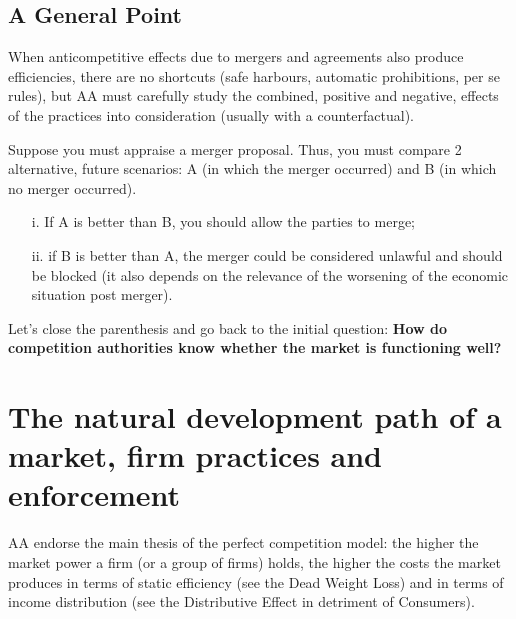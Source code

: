     \subsection{A General Point}
    
        When anticompetitive effects due to mergers and agreements also produce efficiencies, there are no shortcuts (safe harbours, automatic prohibitions, per se rules), but AA must carefully study the combined, positive and negative, effects of the practices into consideration (usually with a counterfactual). 
        
        Suppose you must appraise a merger proposal. Thus, you must compare 2 alternative, future scenarios: A (in which the merger occurred) and B (in which no merger occurred).
        \begin{enumerate}
            \item[i.] If A is better than B, you should allow the parties to merge;
            \item[ii.] if B is better than A, the merger could be considered unlawful and should be blocked (it also depends on the relevance of the worsening of the economic situation post merger).
        \end{enumerate}

    
        Let’s close the parenthesis and go back to the initial question: \textbf{How do competition authorities know whether the market is functioning well?}

\section{The natural development path of a market, firm practices and enforcement}

    AA endorse the main thesis of the perfect competition model: the higher the market power a firm (or a group of firms) holds, the higher the costs the market produces in terms of static efficiency (see the Dead Weight Loss) and in terms of income distribution (see the Distributive Effect in detriment of Consumers).

